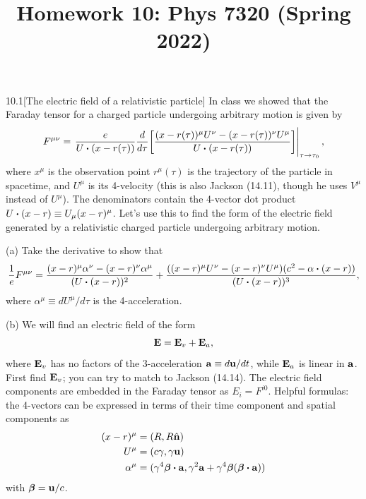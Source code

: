 \documentclass[12pt]{article}
\title{Homework 10: Phys 7320 (Spring 2022)}
\begin{document}
\maketitle
\begin{problem}{10.1}[The electric field of a relativistic particle]
In class we showed that the Faraday tensor for a charged particle undergoing
arbitrary motion is given by
\begin{equation}
    F^{\mu\nu}=\eval{\frac{e}{U\vdot(x-r(\tau))}
    \frac{d}{d\tau}\qty[\frac{(x-r(\tau))^\mu
U^\nu-(x-r(\tau))^{\nu}U^\mu}{U\vdot(x-r(\tau))}]}_{\tau\to\tau_0},
\end{equation}
where $x^\mu$ is the observation point $r^{\mu}(\tau)$ is the trajectory of the
particle in spacetime, and $U^\mu$ is its 4-velocity (this is also Jackson
(14.11), though he uses $V^\mu$ instead of $U^\mu$). The denominators contain
the 4-vector dot product $U\vdot(x-r)\equiv U_\mu(x-r)^\mu$. Let's use this to
find the form of the electric field generated by a relativistic charged particle
undergoing arbitrary motion.

(a) Take the derivative to show that
\begin{equation}
    \frac1eF^{\mu\nu}=\frac{(x-r)^\mu\alpha^\nu-(x-r)^\nu\alpha^\mu}{(U\vdot(x-r))^2}+\frac{((x-r)^\mu
    U^\nu-(x-r)^\nu U^\mu)(c^2-\alpha\vdot(x-r))}{(U\vdot (x-r))^3}, 
\end{equation}
where $\alpha^\mu\equiv dU^\mu/d\tau$ is the 4-acceleration.

(b) We will find an electric field of the form
\begin{equation}
    \vb{E}=\vb{E}_v+\vb{E}_a, 
\end{equation}
where $\vb{E}_v$ has no factors of the 3-acceleration $\vb{a}\equiv d\vb{u}/dt$,
while $\vb{E}_a$ is linear in $\vb{a}$. First find $\vb{E}_v$; you can try to
match to Jackson (14.14). The electric field components are embedded in the
Faraday tensor as $E_i=F^{i0}$. Helpful formulas: the 4-vectors can be expressed
in terms of their time component and spatial components as
    \begin{align}
        (x-r)^\mu&= (R,R\hat{\vb{n}})\notag\\
        U^\mu&=(c\gamma,\gamma\vb{u})\\ \alpha^\mu&=(\gamma^4\bm\beta\vdot\vb{a},\gamma^2\vb{a}+\gamma^4\bm\beta(\bm\beta\vdot\vb{a}))\notag
    \end{align} 
with $\bm\beta=\vb{u}/c$.


\end{problem}
\end{document}
